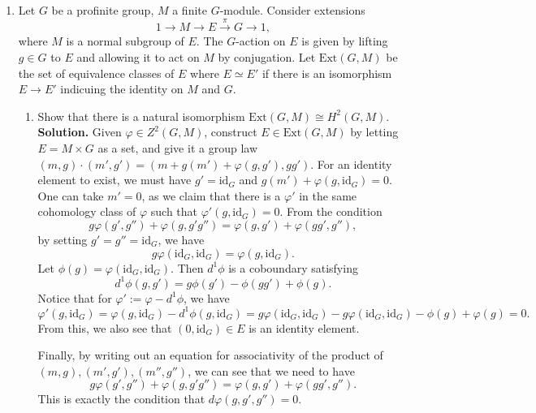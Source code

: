\documentclass[11pt]{amsart}
\theoremstyle{named}
\begin{document}
\begin{enumerate}[label=\textbf{(\arabic*)},wide, labelwidth=!, labelindent=0pt]
\item Let $G$ be a profinite group, $M$ a finite $G$-module. Consider extensions \[ 1 \rightarrow M \rightarrow E \xrightarrow{\pi} G \rightarrow 1,\] where $M$ is a normal subgroup of $E$. The $G$-action on $E$ is given by lifting $g \in G$ to $E$ and allowing it to act on $M$ by conjugation. Let $\mathrm{Ext}(G, M)$ be the set of equivalence classes of $E$ where $E \simeq E'$ if there is an isomorphism $E \rightarrow E'$ indicuing the identity on $M$ and $G$.
\begin{enumerate}[label=\textbf{\alph*.}, wide, labelwidth=!, labelindent=20pt]
\item Show that there is a natural isomorphism $\mathrm{Ext}(G, M) \cong H^2(G, M).$
\newline \\
\noindent\textbf{Solution.} Given $\varphi \in Z^2(G, M)$, construct $E \in \mathrm{Ext}(G, M)$ by letting $E = M \times G$ as a set, and give it a group law $(m, g) \cdot (m', g') = (m + g(m') + \varphi(g, g'), gg').$ For an identity element to exist, we must have $g' = \mathrm{id}_G$ and $g(m') + \varphi(g, \mathrm{id}_G) = 0$. One can take $m' = 0$, as we claim that there is a $\varphi'$ in the same cohomology class of $\varphi$ such that $\varphi'(g, \mathrm{id}_G) = 0$. From the condition \[ g \varphi(g', g'') + \varphi(g, g'g'') = \varphi(g, g') + \varphi(g g', g''),\] by setting $g' = g'' = \mathrm{id}_G$, we have \[ g \varphi(\mathrm{id}_G, \mathrm{id}_G) = \varphi(g, \mathrm{id}_G).\] Let $\phi(g) = \varphi(\mathrm{id}_G, \mathrm{id}_G).$ Then $d^1\phi$ is a coboundary satisfying \[ d^1\phi(g, g') = g \phi(g') - \phi(g g') + \phi(g).\] Notice that for $\varphi' := \varphi - d^1\phi$, we have \[\varphi'(g, \mathrm{id}_G) = \varphi(g, \mathrm{id}_G) - d^1\phi(g, \mathrm{id}_G) = g \varphi(\mathrm{id}_G, \mathrm{id}_G) - g \varphi(\mathrm{id}_G, \mathrm{id}_G) - \phi(g) + \varphi(g) = 0.\] From this, we also see that $(0, \mathrm{id}_G) \in E$ is an identity element.

Finally, by writing out an equation for associativity of the product of $(m, g), (m', g'), (m'', g'')$, we can see that we need to have \[ g \varphi(g', g'') + \varphi(g, g' g'') = \varphi(g, g') + \varphi(g g', g'').\] This is exactly the condition that $d\varphi(g, g', g'') = 0.$


\end{enumerate}
\end{enumerate}
\end{document}
